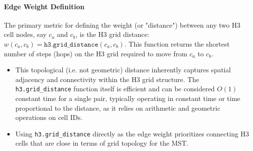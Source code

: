 \paragraph{Edge Weight Definition}
The primary metric for defining the weight (or "distance") between any two H3 cell nodes, say $c_a$ and $c_b$, is the H3 grid distance: $w(c_a, c_b) = \texttt{h3.grid\_distance}(c_a, c_b)$. 
This function returns the shortest number of steps (hops) on the H3 grid required to move from $c_a$ to $c_b$.
\begin{itemize}
    \item This topological (i.e. not geometric) distance inherently captures spatial adjacency and connectivity within the H3 grid structure. 
    The \texttt{h3.grid\_distance} function itself is efficient and can be considered $O(1)$ constant time for a single pair\cite{H3_Algorithm1}, typically operating in constant time or time proportional to the distance, as it relies on arithmetic and geometric operations on cell IDs.
    \item Using \texttt{h3.grid\_distance} directly as the edge weight prioritizes connecting H3 cells that are close in terms of grid topology for the MST.
\end{itemize}

